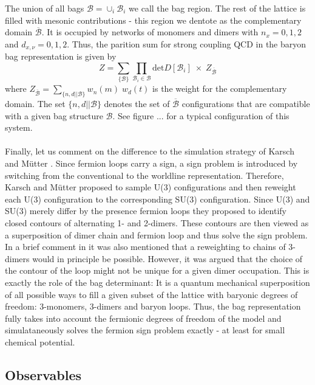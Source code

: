 \documentclass{PoS}
\begin{document}
The union of all bags $\mathcal{B} = \cup_i \mathcal{B}_i$ we call the bag region. The rest of the lattice is filled with mesonic contributions - this region we dentote as the complementary domain $\overline{\mathcal{B}}$. It is occupied by networks of  monomers and dimers with $n_x = 0,1,2$ and $d_{x,\nu} = 0,1,2$. Thus, the parition sum for strong coupling QCD in the baryon bag representation is given by
\begin{equation}
Z = \sum_{\{\mathcal{B}\}}\prod_{\mathcal{B}_i \in \mathcal{B}} \text{det}D[\mathcal{B}_i] \; \times \; Z_{\overline{\mathcal{B}}}
\end{equation}
where $Z_{\overline{\mathcal{B}}} = \sum_{\{n, d || \mathcal{B}\}} w_n(m) \; w_d(t)$ is the weight for the complementary domain. The set $\{n, d || \mathcal{B}\}$ denotes the set of $\overline{\mathcal{B}}$ configurations that are compatible with a given bag structure $\mathcal{B}$. See figure ... for a typical configuration of this system.\\
\\
Finally, let us comment on the difference to the simulation strategy of Karsch and M\"utter \cite{Karsch:1988zx}. Since fermion loops carry a sign, a sign problem is introduced by switching from the conventional to the worldline representation. Therefore, Karsch and M\"utter proposed to sample U(3) configurations and then reweight each U(3) configuration to the corresponding SU(3) configuration. Since U(3) and SU(3) merely differ by the presence fermion loops they proposed to identify closed contours of alternating 1- and 2-dimers. These contours are then viewed as a superposition of dimer chain and fermion loop and thus solve the sign problem. In a brief comment in \cite{Karsch:1988zx} it was also mentioned that a reweighting to chains of 3-dimers would in principle be possible. However, it was argued that the choice of the contour of the loop might not be unique for a given dimer occupation. This is exactly the role of the bag determinant: It is a quantum mechanical superposition of all possible ways to fill a given subset of the lattice with baryonic degrees of freedom: 3-monomers, 3-dimers and baryon loops. Thus, the bag representation fully takes into account the fermionic degrees of freedom of the model and simulataneously solves the fermion sign problem exactly - at least for small chemical potential.

\subsection{Observables}
\end{document}

